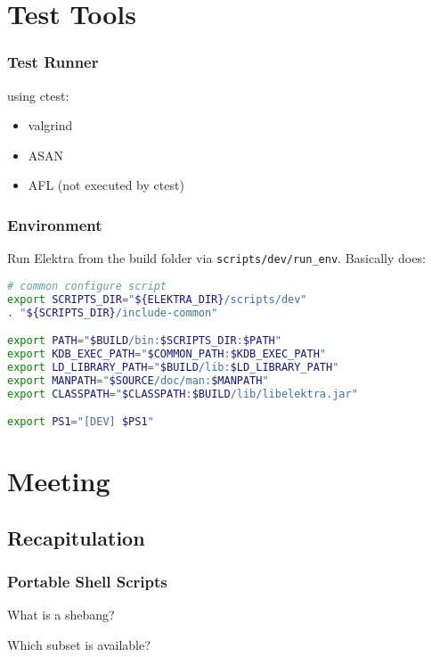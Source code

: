 \section{Test Tools}

\begin{frame}[label=test runner]
	\frametitle{Test Runner}

	using ctest:

	\begin{itemize}
	\item valgrind
	\item ASAN
	\item AFL (not executed by ctest)
	\end{itemize}
\end{frame}

\begin{frame}[fragile]
	\frametitle{Environment}

	Run Elektra from the build folder via \texttt{scripts/dev/run_env}.
	Basically does:

	\begin{lstlisting}[language=sh]
# common configure script
export SCRIPTS_DIR="${ELEKTRA_DIR}/scripts/dev"
. "${SCRIPTS_DIR}/include-common"

export PATH="$BUILD/bin:$SCRIPTS_DIR:$PATH"
export KDB_EXEC_PATH="$COMMON_PATH:$KDB_EXEC_PATH"
export LD_LIBRARY_PATH="$BUILD/lib:$LD_LIBRARY_PATH"
export MANPATH="$SOURCE/doc/man:$MANPATH"
export CLASSPATH="$CLASSPATH:$BUILD/lib/libelektra.jar"

export PS1="[DEV] $PS1"\end{lstlisting}
\end{frame}

\section{Meeting}

\subsection{Recapitulation}


\begin{frame}
	\frametitle{Portable Shell Scripts}

	What is a shebang?

	Which subset is available?
\end{frame}

